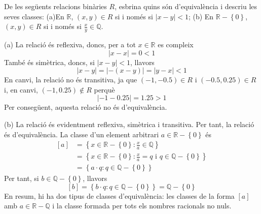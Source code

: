 \begin{exercici}
De les seg\"{u}ents relacions bin\`{a}ries $R$, esbrina quins s\'{o}n
d'equival\`{e}ncia i descriu les seves classes: (a)En $\mathbb{R}$, $\left(
x,y\right) \in R$ si i nom\'{e}s si $\left\vert x-y\right\vert <1$; (b) En $%
\mathbb{R}-\left\{ 0\right\} $, $\left( x,y\right) \in R$ si i nom\'{e}s si $%
\frac{x}{y}\in \mathbb{Q}$.
\end{exercici}

\begin{solucio}
(a) La relaci\'{o} \'{e}s reflexiva, doncs, per a tot $x\in \mathbb{R}$ es
compleix%
\begin{equation*}
\left\vert x-x\right\vert =0<1
\end{equation*}%
Tamb\'{e} \'{e}s sim\`{e}trica, doncs, si $\left\vert x-y\right\vert <1$,
llavors%
\begin{equation*}
\left\vert x-y\right\vert =\left\vert -\left( x-y\right) \right\vert
=\left\vert y-x\right\vert <1
\end{equation*}%
En canvi, la relaci\'{o} no \'{e}s transitiva, ja que $\left( -1,-0.5\right)
\in R$ i $\left( -0.5,0.25\right) \in R$ i, en canvi, $\left( -1,0.25\right)
\notin R$ perqu\`{e}%
\begin{equation*}
\left\vert -1-0.25\right\vert =1.25>1
\end{equation*}%
Per conseg\"{u}ent, aquesta relaci\'{o} no \'{e}s d'equival\`{e}ncia.

(b) La relaci\'{o} \'{e}s evidentment reflexiva, sim\`{e}trica i transitiva.
Per tant, la relaci\'{o} \'{e}s d'equival\`{e}ncia. La classe d'un element
arbitrari $a\in \mathbb{R}-\left\{ 0\right\} $ \'{e}s%
\begin{align*}
\left[ a\right] & =\left\{ x\in \mathbb{R}-\left\{ 0\right\} :\frac{x}{a}\in
\mathbb{Q}\right\} \\
& =\left\{ x\in \mathbb{R}-\left\{ 0\right\} :\frac{x}{a}=q\text{ \ i \ }%
q\in \mathbb{Q}-\left\{ 0\right\} \right\} \\
& =\left\{ a\cdot q:q\in \mathbb{Q}-\left\{ 0\right\} \right\}
\end{align*}%
Per tant, si $b\in \mathbb{Q}-\left\{ 0\right\} $, llavors%
\begin{equation*}
\left[ b\right] =\left\{ b\cdot q:q\in \mathbb{Q}-\left\{ 0\right\} \right\}
=\mathbb{Q}-\left\{ 0\right\}
\end{equation*}%
En resum, hi ha dos tipus de classes d'equival\`{e}ncia: les classes de la
forma $\left[ a\right] $ amb $a\in \mathbb{R}-\mathbb{Q}$ i la classe
formada per tots els nombres racionals no nuls.
\end{solucio}

